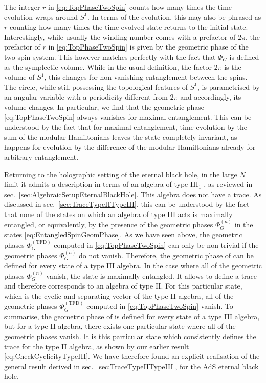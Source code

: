 \documentclass[a4paper,11pt]{article}
\newcommand{\1}{\mathds{1}}
\begin{document}
The integer $r$ in \eqref{eq:TopPhaseTwoSpin} counts how many times the time evolution wraps around $S^1$. In terms of the evolution, this may also be phrased as $r$ counting how many times the time evolved state returns to the initial state. Interestingly, while usually the winding number comes with a prefactor of $2\pi$, the prefactor of $r$ in \eqref{eq:TopPhaseTwoSpin} is given by the geometric phase of the two-spin system. This however matches perfectly with the fact that $\Phi_G$ is defined as the symplectic volume. While in the usual definition, the factor $2\pi$ is the volume of $S^1$, this changes for non-vanishing entanglement between the spins. The circle, while still possessing the topological features of $S^1$, is parametrised by an angular variable with a periodicity different from $2\pi$ and accordingly, its volume changes. In particular, we find that the geometric phase \eqref{eq:TopPhaseTwoSpin} always vanishes for maximal entanglement. This can be understood by the fact that for maximal entanglement, time evolution by the sum of the modular Hamiltonians leaves the state completely invariant, as happens for evolution by the difference of the modular Hamiltonians already for arbitrary entanglement.

Returning to the holographic setting of the eternal black hole,  in the large $N$ limit it admits a description in terms of an algebra of type III$_1$ \cite{Leutheusser:2021frk,Leutheusser:2021qhd}, as reviewed in sec.~\ref{sec:AlgebraicSetupEternalBlackHole}. This algebra does not have a trace. As discussed in sec.~\ref{sec:TraceTypeIITypeIII}, this can be understood by the fact that none of the states on which an algebra of type III acts is maximally entangled, or equivalently, by the presence of the geometric phases $\Phi_G^{(n)}$ in the states \eqref{eq:EntangledSpinGeomPhase}. As we have seen above, the geometric phases $\Phi_G^{(\text{TFD})}$ computed in \eqref{eq:TopPhaseTwoSpin} can only be non-trivial if the geometric phases $\Phi_G^{(n)}$ do not vanish. Therefore, the geometric phase of \cite{Nogueira:2021ngh} can be defined for every state of a type III algebra. In the case where all of the geometric phases $\Phi_G^{(n)}$ vanish, the state is maximally entangled. It allows to define a trace and therefore corresponds to an algebra of type II. For this particular state, which is the cyclic and separating vector of the type II algebra, all of the geometric phases $\Phi_G^{(\text{TFD})}$ computed in \eqref{eq:TopPhaseTwoSpin} vanish. To summarise, the geometric phase of \cite{Nogueira:2021ngh} is defined for every state of a type III algebra, but for a type II algebra, there exists one particular state where all of the geometric phases vanish. It is this particular state which consistently defines the trace for the type II algebra, as shown by our earlier result \eqref{eq:CheckCyclicityTypeIII}. We have therefore found an explicit realisation of the general result derived in sec.~\ref{sec:TraceTypeIITypeIII},  for the AdS eternal black hole.
\end{document}
